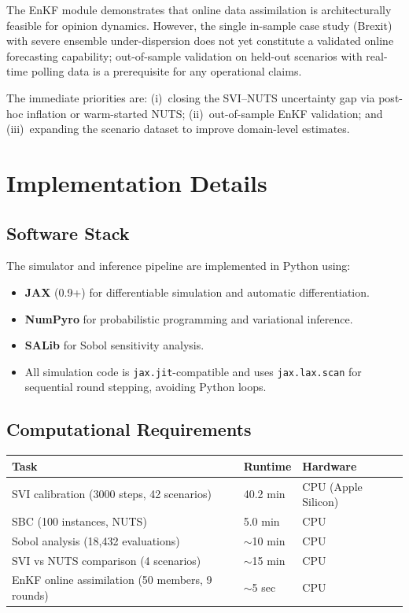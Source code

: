 \documentclass[12pt]{article}
\begin{document}
The EnKF module demonstrates that online data assimilation is architecturally feasible for opinion dynamics. However, the single in-sample case study (Brexit) with severe ensemble under-dispersion does not yet constitute a validated online forecasting capability; out-of-sample validation on held-out scenarios with real-time polling data is a prerequisite for any operational claims.

The immediate priorities are: (i)~closing the SVI--NUTS uncertainty gap via post-hoc inflation or warm-started NUTS; (ii)~out-of-sample EnKF validation; and (iii)~expanding the scenario dataset to improve domain-level estimates.

\appendix

\section{Implementation Details}
\label{app:implementation}

\subsection{Software Stack}

The simulator and inference pipeline are implemented in Python using:
\begin{itemize}
    \item \textbf{JAX} (0.9+) for differentiable simulation and automatic differentiation.
    \item \textbf{NumPyro} for probabilistic programming and variational inference.
    \item \textbf{SALib} for Sobol sensitivity analysis.
    \item All simulation code is \texttt{jax.jit}-compatible and uses \texttt{jax.lax.scan} for sequential round stepping, avoiding Python loops.
\end{itemize}

\subsection{Computational Requirements}

\begin{table}[H]
\centering
\begin{tabular}{lll}
\toprule
Task & Runtime & Hardware \\
\midrule
SVI calibration (3000 steps, 42 scenarios) & 40.2 min & CPU (Apple Silicon) \\
SBC (100 instances, NUTS) & 5.0 min & CPU \\
Sobol analysis (18,432 evaluations) & $\sim$10 min & CPU \\
SVI vs NUTS comparison (4 scenarios) & $\sim$15 min & CPU \\
EnKF online assimilation (50 members, 9 rounds) & $\sim$5 sec & CPU \\
\bottomrule
\end{tabular}
\end{table}
\end{document}
